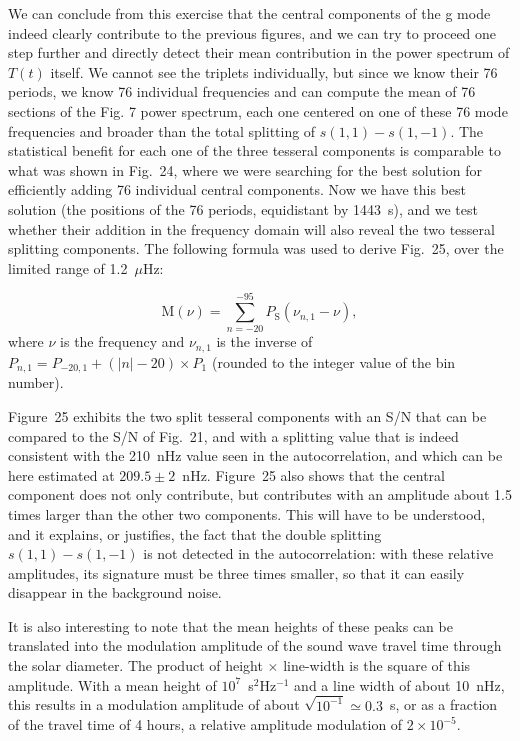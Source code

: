 \documentclass[bibyear]{aa}
\begin{document}
We can conclude from this exercise that the central components of the g mode indeed clearly contribute to the previous figures, and we can try to proceed one step further and directly detect their mean contribution in the power spectrum of $T(t)$ itself. We cannot see the triplets individually, but since we know their 76 periods, we know 76 individual frequencies and can compute the mean of 76 sections of the Fig. 7 power spectrum, each one centered on one of these 76 mode frequencies and broader than the total splitting of $s(1,1)-s(1,-1)$. The statistical benefit for each one of the three tesseral components is comparable to what  was shown in Fig.~24, where we were searching for the best solution for efficiently adding 76 individual central components. Now we have this best solution (the positions of the 76 periods, equidistant by 1443~s), and we test whether their addition in the frequency domain will also reveal the two tesseral splitting components. The following formula was used to derive Fig.~25, over the limited range of 1.2~$\mu$Hz: 

\begin{equation}\label{eq:M}
\mathrm{M}(\nu)=\sum_{n=-20}^{-95} {P_\mathrm{S}(\nu_{n,1}-\nu)}
,\end{equation}
where $\nu$ is the frequency and $\nu_{n,1}$ is the inverse of $P_{n,1}=P_{-20,1}+(|n|-20)\times P_1$  (rounded to the integer value of the bin number). 

Figure~25 exhibits the two split tesseral components with an S/N that can be compared to the S/N of Fig.~21, and with a splitting value that is indeed consistent with the 210~nHz value seen in the autocorrelation, and which can be here estimated at $209.5\pm 2$~nHz. Figure~25 also shows that the central component does not only contribute, but contributes with an amplitude about 1.5 times larger than the other two components. This will have to be understood, and it explains, or justifies, the fact that the double splitting $s(1,1)-s(1,-1)$ is not detected in the autocorrelation: with these relative amplitudes, its signature must be three times smaller, so that it can easily disappear in the background noise. 

It is also interesting to note that the mean heights of these peaks can be translated into the modulation amplitude of the sound wave travel time through the solar diameter. The product of height $\times$ line-width is the square of this amplitude. With a mean height of $10^{7}$~s$^2$Hz$^{-1}$ and a line width of about 10~nHz, this results in a  modulation amplitude of about  $\sqrt{10^{-1}}\simeq 0.3$~s, or as a fraction of the travel time of 4 hours, a relative amplitude modulation of $2\times 10^{-5}$.
\end{document}
